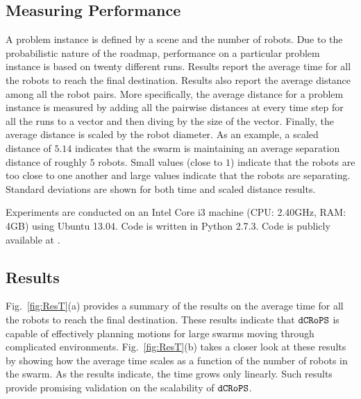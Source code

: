 \documentclass[letterpaper, 10pt, conference]{ieeeconf}
\newcommand{\Acronym}[1]{\ensuremath{{\small{\texttt{#1}}}}}
\newcommand{\Var}[1]{\ensuremath{{\small{\textsl{#1}}}}}
\newcommand{\Name}{\Acronym{dCRoPS}}
\begin{document}
\subsection{Measuring Performance}
\label{sec:Measures}
A problem instance is defined by a scene and the number of robots. Due
to the probabilistic nature of the roadmap, performance on a
particular problem instance is based on twenty different runs.
Results report the average time for all the robots to reach the final
destination. Results also report the average distance among all the
robot pairs. More specifically, the average distance for a problem instance is measured by
adding all the pairwise distances at every time step for all the runs
to a vector and then diving by the size of the vector. Finally, the
average distance is scaled by the robot diameter. As an example, a
scaled distance of $5.14$ indicates that the swarm is maintaining an average
separation distance of roughly $5$ robots.  Small values (close to $1$)
indicate that the robots are too close to one another and large values
indicate that the robots are separating. Standard deviations are shown
for both time and scaled distance results.


Experiments are conducted on an Intel Core i3 machine (CPU: 2.40GHz,
RAM: 4GB) using Ubuntu 13.04. Code is written in Python 2.7.3. Code is
publicly available at \cite{CodeBoids}.

\subsection{Results}
\label{sec:Results}

Fig.~\ref{fig:ResT}(a) provides a summary of the results on the
average time for all the robots to reach the final
destination. These results indicate that $\Name$ is capable of
effectively planning motions for large swarms moving through
complicated environments. Fig.~\ref{fig:ResT}(b) takes a closer
look at these results by showing how
the average time scales as a function of the number of robots in the
swarm. As the results indicate, the time grows only linearly. Such
results provide promising validation on the scalability of $\Name$. 
\end{document}
